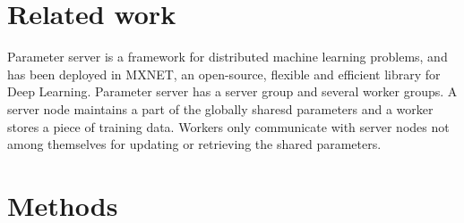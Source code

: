 


\section{Related work}




Parameter server\cite{muli-ps} is a framework for distributed machine learning problems, and has been deployed in MXNET, an open-source, flexible and efficient library for Deep Learning\cite{chen2015mxnet}. Parameter server has a server group and several worker groups. A server node maintains a part of the globally sharesd parameters and a worker stores a piece of training data. Workers only communicate with server nodes not among themselves for updating or retrieving the shared parameters.



\section{Methods}






